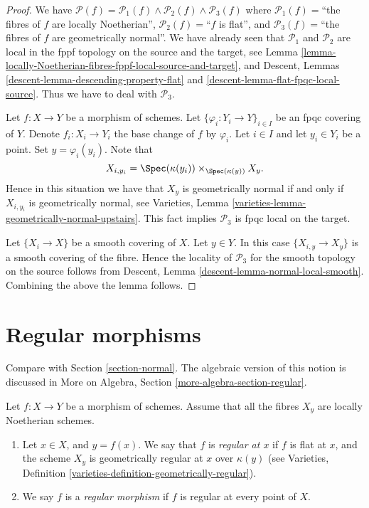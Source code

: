 \begin{proof}
We have
$\mathcal{P}(f) =
\mathcal{P}_1(f) \wedge \mathcal{P}_2(f) \wedge \mathcal{P}_3(f)$
where
$\mathcal{P}_1(f)=$``the fibres of $f$ are locally Noetherian'',
$\mathcal{P}_2(f)=$``$f$ is flat'', and
$\mathcal{P}_3(f)=$``the fibres of $f$ are geometrically normal''.
We have already seen that $\mathcal{P}_1$ and $\mathcal{P}_2$
are local in the fppf topology on the source and the target, see
Lemma \ref{lemma-locally-Noetherian-fibres-fppf-local-source-and-target},
and Descent, Lemmas \ref{descent-lemma-descending-property-flat} and
\ref{descent-lemma-flat-fpqc-local-source}. Thus we have to deal
with $\mathcal{P}_3$.

\medskip\noindent
Let $f : X \to Y$ be a morphism of schemes.
Let $\{\varphi_i : Y_i \to Y\}_{i \in I}$ be an fpqc covering of $Y$.
Denote $f_i : X_i \to Y_i$ the base change of $f$ by $\varphi_i$.
Let $i \in I$ and let $y_i \in Y_i$ be a point.
Set $y = \varphi_i(y_i)$. Note that
$$
X_{i, y_i} = \Spec(\kappa(y_i)) \times_{\Spec(\kappa(y))} X_y.
$$
Hence in this situation we have that $X_y$ is geometrically normal if and
only if $X_{i, y_i}$ is geometrically normal, see
Varieties, Lemma \ref{varieties-lemma-geometrically-normal-upstairs}.
This fact implies $\mathcal{P}_3$ is fpqc local on the target.

\medskip\noindent
Let $\{X_i \to X\}$ be a smooth covering of $X$.
Let $y \in Y$. In this case $\{X_{i, y} \to X_y\}$ is a
smooth covering of the fibre. Hence the locality of $\mathcal{P}_3$
for the smooth topology on the source follows from
Descent, Lemma \ref{descent-lemma-normal-local-smooth}.
Combining the above the lemma follows.
\end{proof}



\section{Regular morphisms}
\label{section-regular}

\noindent
Compare with Section \ref{section-normal}. The algebraic version of
this notion is discussed in
More on Algebra, Section \ref{more-algebra-section-regular}.

\begin{definition}
\label{definition-regular}
Let $f : X \to Y$ be a morphism of schemes.
Assume that all the fibres $X_y$ are locally Noetherian schemes.
\begin{enumerate}
\item Let $x \in X$, and $y = f(x)$. We say that $f$ is {\it regular at $x$}
if $f$ is flat at $x$, and the scheme $X_y$ is geometrically
regular at $x$ over $\kappa(y)$ (see
Varieties, Definition \ref{varieties-definition-geometrically-regular}).
\item We say $f$ is a {\it regular morphism} if $f$ is regular
at every point of $X$.
\end{enumerate}
\end{definition}

